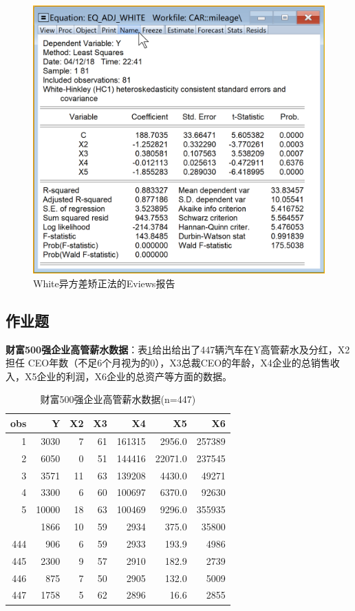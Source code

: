 \documentclass[12pt,(landscape,a4paper),(portrait,a4paper)]{article}
\begin{document}
\begin{figure}

{\centering \includegraphics[width=18.53in]{picture/lab6-heteroskedasticity/5-adj-white2} 

}

\caption{White异方差矫正法的Eviews报告}\label{fig:fig-adj-white-report}
\end{figure}

\subsection{作业题}

\textbf{财富500强企业高管薪水数据}：表\ref{tab:data-salary}给出给出了447辆汽车在Y高管薪水及分红，X2担任
CEO年数（不足6个月视为的0），X3总裁CEO的年龄，X4企业的总销售收入，X5企业的利润，X6企业的总资产等方面的数据。

\begin{table}

\caption{\label{tab:data-salary}财富500强企业高管薪水数据(n=447)}
\centering
\begin{tabular}[t]{rrrrrrr}
\toprule
obs & Y & X2 & X3 & X4 & X5 & X6\\
\midrule
1 & 3030 & 7 & 61 & 161315 & 2956.0 & 257389\\
2 & 6050 & 0 & 51 & 144416 & 22071.0 & 237545\\
3 & 3571 & 11 & 63 & 139208 & 4430.0 & 49271\\
4 & 3300 & 6 & 60 & 100697 & 6370.0 & 92630\\
5 & 10000 & 18 & 63 & 100469 & 9296.0 & 355935\\
\addlinespace
443 & 1866 & 10 & 59 & 2934 & 375.0 & 35800\\
444 & 906 & 6 & 59 & 2933 & 193.9 & 4986\\
445 & 2300 & 9 & 57 & 2910 & 182.9 & 2739\\
446 & 875 & 7 & 50 & 2905 & 132.0 & 5009\\
447 & 1758 & 5 & 62 & 2896 & 16.6 & 2855\\
\bottomrule
\end{tabular}
\end{table}
\end{document}

